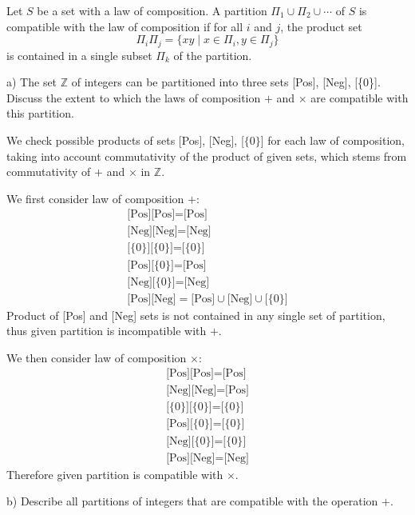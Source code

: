 \documentclass{article}
\theoremstyle{definition}
\newcommand{\Z}{\mathbb{Z}}
\begin{document}
\begin{tcolorbox}
Let $S$ be a set with a law of composition. A partition $\Pi_1 \cup \Pi_2 \cup \cdots$ of $S$ is compatible with the law of composition if for all $i$ and $j$, the product set
\[ \Pi_i \Pi_j = \{ xy \mid x \in \Pi_i, y \in \Pi_j \} \]
is contained in a single subset $\Pi_k$ of the partition.

a) The set $\Z$ of integers can be partitioned into three sets [Pos], [Neg], [\{0\}]. Discuss the extent to which the laws of composition $+$ and $\times$ are compatible with this partition.

\end{tcolorbox}

We check possible products of sets [Pos], [Neg], [$\{0\}$] for each law of composition, taking into account commutativity of the product of given sets, which stems from commutativity of $+$ and $\times$ in $\Z$.

We first consider law of composition $+$:
\begin{gather*}
    \text{[Pos]}\text{[Pos]} = \text{[Pos]} \\
    \text{[Neg]}\text{[Neg]} = \text{[Neg]} \\
    \text{[\{0\}]}\text{[\{0\}]} = \text{[\{0\}]} \\
    \text{[Pos]}\text{[\{0\}]} = \text{[Pos]} \\
    \text{[Neg]}\text{[\{0\}]} = \text{[Neg]} \\
    \text{[Pos]}\text{[Neg]} = \text{[Pos]} \cup \text{[Neg]} \cup \text{[\{0\}]}
\end{gather*}
Product of [Pos] and [Neg] sets is not contained in any single set of partition, thus given partition is incompatible with $+$.

We then consider law of composition $\times$:
\begin{gather*}
    \text{[Pos]}\text{[Pos]} = \text{[Pos]} \\
    \text{[Neg]}\text{[Neg]} = \text{[Pos]} \\
    \text{[\{0\}]}\text{[\{0\}]} = \text{[\{0\}]} \\
    \text{[Pos]}\text{[\{0\}]} = \text{[\{0\}]} \\
    \text{[Neg]}\text{[\{0\}]} = \text{[\{0\}]} \\
    \text{[Pos]}\text{[Neg]} = \text{[Neg]}
\end{gather*}
Therefore given partition is compatible with $\times$.


\begin{tcolorbox}
b) Describe all partitions of integers that are compatible with the operation $+$.
\end{tcolorbox}
\end{document}
